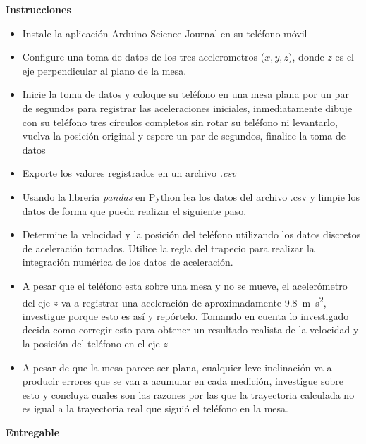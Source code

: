 \documentclass[12pt]{article}
\begin{document}
\setlength{\parindent}{0em}

\noindent\textbf{Instrucciones}
\begin{itemize}
    \item Instale la aplicación Arduino Science Journal en su teléfono móvil
    \item Configure una toma de datos de los tres acelerometros ($x,y,z$), donde $z$ es el eje perpendicular al plano de la mesa. 
    \item Inicie la toma de datos y coloque su teléfono en una mesa plana por un par de segundos para registrar las aceleraciones iniciales, inmediatamente dibuje con su teléfono tres círculos completos sin rotar su teléfono ni levantarlo, vuelva la posición original y espere un par de segundos, finalice la toma de datos
    \item Exporte los valores registrados en un archivo \emph{.csv}
    \item Usando la librería \emph{pandas} en Python lea los datos del archivo .csv y limpie los datos de forma que pueda realizar el siguiente paso.   
    \item Determine la velocidad y la posición del teléfono utilizando los datos discretos de aceleración tomados. Utilice la regla del trapecio para realizar la integración numérica de los datos de aceleración.
    \item A pesar que el teléfono esta sobre una mesa y no se mueve, el acelerómetro del eje $z$ va a registrar una aceleración de aproximadamente \SI{9.8}{\meter\second\squared}, investigue porque esto es así y repórtelo. Tomando en cuenta lo investigado decida como corregir esto para obtener un resultado realista de la velocidad y la posición del teléfono en el eje $z$
    \item A pesar de que la mesa parece ser plana, cualquier leve inclinación va a producir errores que se van a acumular en cada medición, investigue sobre esto y concluya cuales son las razones por las que la trayectoria calculada no es igual a la trayectoria real que siguió el teléfono en la mesa.
\end{itemize}


\noindent\textbf{Entregable}
\end{document}
